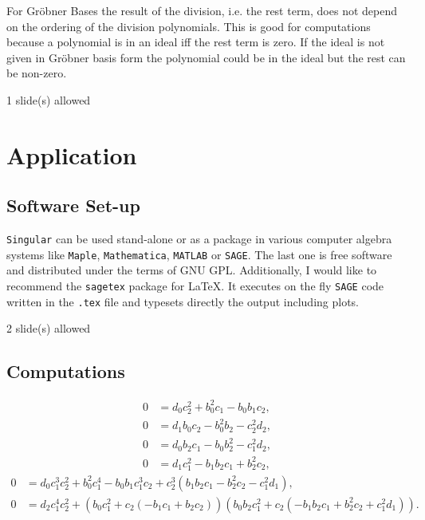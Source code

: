 \documentclass[11pt,a4paper,english]{scrartcl}
\newcommand{\needSlides}[1]{\newpage \begin{needSl}#1 slide(s) allowed\end{needSl}}
\begin{document}
For Gröbner Bases the result of the division, i.e. the rest term, does not depend on the ordering of the division polynomials. This is good for computations because a polynomial is in an ideal iff the rest term is zero. If the ideal is not given in Gröbner basis form the polynomial could be in the ideal but the rest can be non-zero.




\needSlides{1}
\section{Application}
\subsection{Software Set-up}
\verb|Singular| can be used stand-alone or as a package in various computer algebra systems like \verb|Maple|, \verb|Mathematica|, \verb|MATLAB| or \verb|SAGE|. The last one is  free software and distributed under the terms of GNU GPL. Additionally, I would like to recommend the \verb|sagetex| package for \LaTeX. It executes on the fly \verb|SAGE| code written in the \verb|.tex| file and typesets directly the output including plots.
\needSlides{2}
\subsection{Computations}
\begin{align}
0&=d_0 c_2^2 + b_0^2 c_1 - b_0 b_1 c_2,\\
0&=d_1 b_0 c_2 - b_0^2 b_2-c_2^2 d_2,
\end{align}
\begin{align}
0&=d_0 b_2 c_1 - b_0 b_2^2 - c_1^2 d_2,\\
0&=d_1 c_1^2 - b_1 b_2 c_1 + b_2^2 c_2,
\end{align}
\begin{align}
0&=d_0 c_1^3 c_2^2 + b_0^2 c_1^4-b_0 b_1 c_1^3 c_2 + c_2^3 (b_1 b_2 c_1 - b_2^2 c_2 - c_1^2 d_1),\\
0&=d_2 c_1^4 c_2^2+(b_0 c_1^2+c_2 (-b_1 c_1+b_2 c_2)) (b_0 b_2 c_1^2+c_2 (-b_1 b_2 c_1+b_2^2 c_2+c_1^2 d_1)).
\end{align}
\end{document}
